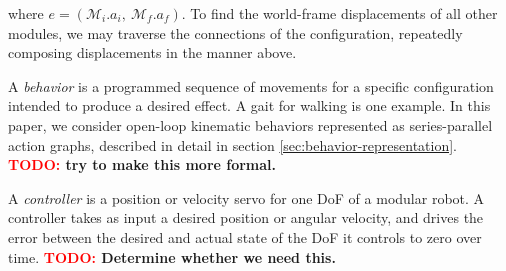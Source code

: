 \documentclass[graybox]{svmult}
\newcommand{\TODO}[1]{ {\bf \textcolor{red}{TODO:} #1 }}
\begin{document}
\begin{definition}[Configuration]
where \(e=(\mathcal{M}_i.a_i,~\mathcal{M}_f.a_f)\). To find the world-frame displacements
of all other modules, we may traverse the connections of the configuration,  repeatedly
composing displacements in the manner above. 
\end{definition}



\begin{definition}[Behavior]\label{def:behavior}
A \textit{behavior} is a programmed sequence of movements for a specific configuration
intended to produce a desired effect.  A gait for walking is one example.  In
this paper, we consider open-loop kinematic behaviors represented as
series-parallel action graphs, described in detail in section
\ref{sec:behavior-representation}. \TODO{try to make this more formal.}
\end{definition}
\begin{definition}[Controller]
A \textit{controller} is a position or velocity servo for one DoF of a modular
robot.  A controller takes as input a desired position or angular velocity, and
drives the error between the desired and actual state of the DoF it controls to
zero over time. \TODO{Determine whether we need this.}
\end{definition}
\end{document}
